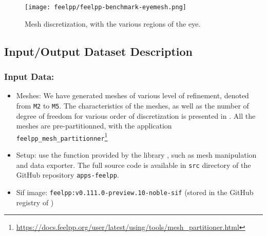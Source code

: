 \begin{figure}
  \centering
  \texttt{[image: feelpp/feelpp-benchmark-eyemesh.png]}
  \caption{Mesh discretization, with the various regions of the eye.}
  \label{fig:spec:app-feelpp:eye2brain:mesh}
\end{figure}




\subsection{Input/Output Dataset Description}


\subsubsection{Input Data:}
  \begin{itemize}
    \item Meshes: We have generated meshes of various level of refinement, denoted from \texttt{M2} to \texttt{M5}.
      The characteristics of the meshes, as well as the number of degree of freedom for various order of discretization is presented in .
      All the meshes are pre-partitionned, with the application \texttt{feelpp\_mesh\_partitionner}\footnote{\url{https://docs.feelpp.org/user/latest/using/tools/mesh_partitioner.html}}
    \item Setup: use the function provided by the library \Feelpp, such as mesh manipulation and data exporter.
      The full source code is available in \texttt{src} directory of the GitHub repository \texttt{apps-feelpp}.
    \item Sif image: \texttt{feelpp:v0.111.0-preview.10-noble-sif}  (stored in the GitHub registry of \Feelpp)
  \end{itemize}

